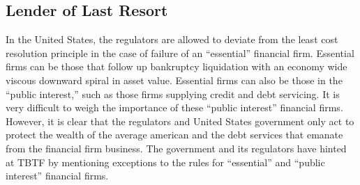 \subsection{Lender of Last Resort}
In the United States, the regulators are allowed to deviate from the least cost resolution principle in the case of failure of an ``essential'' financial firm.\cite{Rime}  Essential firms can be those that follow up bankruptcy liquidation with an economy wide viscous downward spiral in asset value.  Essential firms can also be those in the ``public interest,'' such as those firms supplying credit and debt servicing.  It is very difficult to weigh the importance of these ``public interest'' financial firms.\cite{Kaufman}  However, it is clear that the regulators and United States government only act to protect the wealth of the average american and the debt services that emanate from the financial firm business.  The government and its regulators have hinted at TBTF by mentioning exceptions to the rules for ``essential'' and ``public interest'' financial firms.


%
%
%
%
%
%

